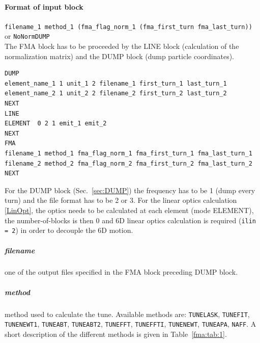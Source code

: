 \paragraph{Format of input block}
\texttt{filename\_1 method\_1 (fma\_flag\_norm\_1 (fma\_first\_turn fma\_last\_turn))}\\
or \texttt{NoNormDUMP}\\

The FMA block has to be proceeded by the LINE block (calculation of the normalization matrix) and the DUMP block (dump particle coordinates).
\begin{verbatim}
DUMP
element_name_1 1 unit_1 2 filename_1 first_turn_1 last_turn_1
element_name_2 1 unit_2 2 filename_2 first_turn_2 last_turn_2
NEXT
LINE
ELEMENT  0 2 1 emit_1 emit_2
NEXT
FMA
filename_1 method_1 fma_flag_norm_1 fma_first_turn_1 fma_last_turn_1
filename_2 method_2 fma_flag_norm_2 fma_first_turn_2 fma_last_turn_2
NEXT
\end{verbatim}
For the DUMP block (Sec.~\ref{sec:DUMP}) the frequency has to be 1 (dump every turn) and the file format has to be 2 or 3.
For the linear optics calculation \ref{LinOpt}, the optics needs to be calculated at each element (mode ELEMENT), the number-of-blocks is then 0 and 6D linear optics calculation is required (\verb|ilin = 2|) in order to decouple the 6D motion. 

\subparagraph{filename}
one of the output files specified in the FMA block preceding DUMP block.
\subparagraph{method}
method used to calculate the tune. Available methods are: \verb|TUNELASK|, \verb|TUNEFIT|, \verb|TUNENEWT1|, \verb|TUNEABT|, \verb|TUNEABT2|, \verb|TUNEFFT|, \verb|TUNEFFTI|, \verb|TUNENEWT|, \verb|TUNEAPA|, \verb|NAFF|. A short description of the different methods is given in Table~\ref{fma:tab:1}.


